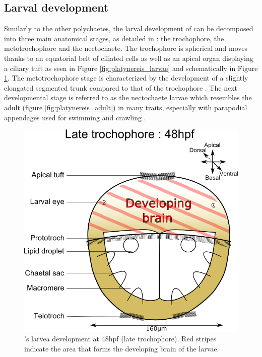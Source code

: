  
     \subsection{Larval development}
    Similarly to the other polychaetes, the larval development of \platy{} can be decomposed into three main anatomical stages, as detailed in \citep{hauenschild69}: the trochophore, the metotrochophore and the nectochaete. The trochophore is spherical and moves thanks to an equatorial belt of ciliated cells as well as an apical organ displaying a ciliary tuft \citep{rouse99,nielsen04} as seen in Figure \ref{fig:platynereis_larvae} and schematically in Figure \ref{fig:platynereis_larvae_scheme}. The metotrochophore stage is characterized by the development of a slightly elongated segmented trunk compared to that of the trochophore \citep{hacker98}. The next developmental stage is referred to as the nectochaete larvae which resembles the adult (figure \ref{fig:platynereis_adult}) in many traits, especially with parapodial appendages used for swimming and crawling \citep{hacker98}.\\
    
\begin{figure}[bth]
\begin{center}
  \includegraphics[width=\linewidth]{gfx/chapter1/larvae48hpf.png}
\end{center}
  \caption{\platyfull{}'s larvea development at 48hpf (late trochophore). Red stripes indicate the area that forms the developing brain of the larvae.}
  \label{fig:platynereis_larvae_scheme}
\end{figure}
    
